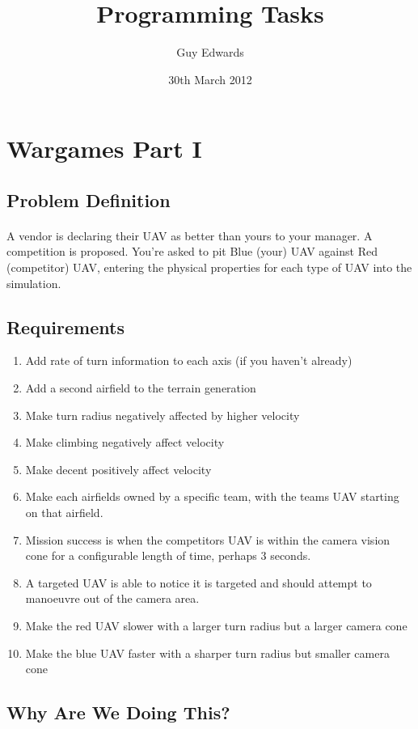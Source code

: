 \documentclass[11pt]{book}
\title{\textbf{Programming Tasks}}
\author{Guy Edwards}
\date{30th March 2012}
\begin{document}
\section{Wargames Part I}

\subsection{Problem Definition}

\paragraph{} A vendor is declaring their UAV as better than yours to your manager. A competition is proposed. You're asked to pit Blue (your) UAV against Red (competitor) UAV, entering the physical properties for each type of UAV into the simulation.

\subsection{Requirements}

\begin{enumerate}
\item Add rate of turn information to each axis (if you haven't already)
\item Add a second airfield to the terrain generation
\item Make turn radius negatively affected by higher velocity
\item Make climbing negatively affect velocity
\item Make decent positively affect velocity
\item Make each airfields owned by a specific team, with the teams UAV starting on that airfield.
\item Mission success is when the competitors UAV is within the camera vision cone for a configurable length of time, perhaps 3 seconds.
\item A targeted UAV is able to notice it is targeted and should attempt to manoeuvre out of the camera area.
\item Make the red UAV slower with a larger turn radius but a larger camera cone
\item Make the blue UAV faster with a sharper turn radius but smaller camera cone
\end{enumerate}

\subsection{Why Are We Doing This?}
\end{document}

